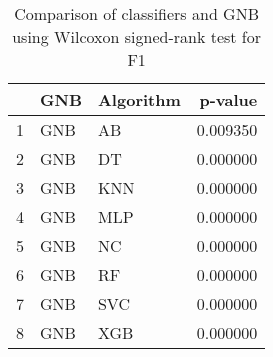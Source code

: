 \begin{table}
\footnotesize
\caption{Comparison of classifiers and GNB using Wilcoxon signed-rank test for F1}
\label{tab:GNB wilcoxon F1 comparison}
\begin{tabular}{lllr}
\hline
 & GNB & Algorithm & p-value \\
\hline
1 & GNB & AB & 0.009350 \\
2 & GNB & DT & 0.000000 \\
3 & GNB & KNN & 0.000000 \\
4 & GNB & MLP & 0.000000 \\
5 & GNB & NC & 0.000000 \\
6 & GNB & RF & 0.000000 \\
7 & GNB & SVC & 0.000000 \\
8 & GNB & XGB & 0.000000 \\
\hline
\end{tabular}
\end{table}
